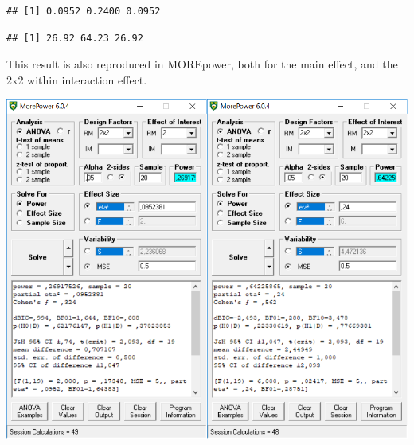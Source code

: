 \documentclass[]{book}
\newenvironment{Shaded}{\begin{snugshade}}{\end{snugshade}}
\newcommand{\NormalTok}[1]{#1}
\newcommand{\OperatorTok}[1]{\textcolor[rgb]{0.81,0.36,0.00}{\textbf{#1}}}
\begin{document}
\begin{verbatim}
## [1] 0.0952 0.2400 0.0952
\end{verbatim}

\begin{Shaded}
\end{Shaded}

\begin{verbatim}
## [1] 26.92 64.23 26.92
\end{verbatim}

This result is also reproduced in MOREpower, both for the main effect, and the 2x2 within interaction effect.

\includegraphics{screenshots/morepower_6.png}


\end{document}
